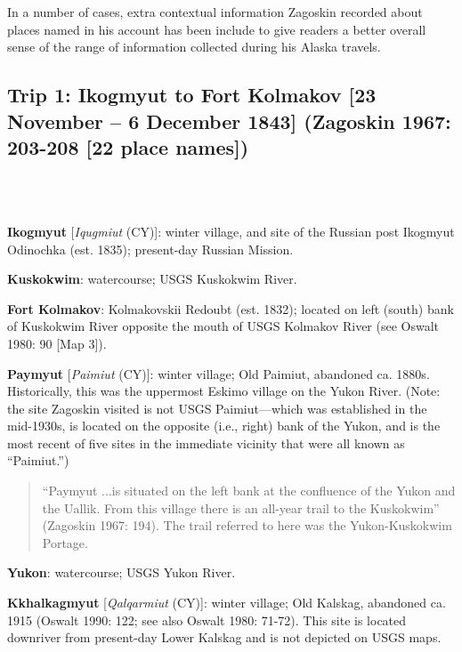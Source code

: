 In a number of cases, extra contextual information Zagoskin recorded about places named in his account has been include to give readers a better overall sense of the range of information collected during his Alaska travels.



\subsection*{Trip 1: Ikogmyut to Fort Kolmakov [23 November – 6 December 1843]
(Zagoskin 1967: 203-208 [22 place names])}
\ \\
\ \\

\begin{hang}

\textbf{Ikogmyut} [\textit{Iqugmiut} (CY)]: winter village, and site of the Russian post Ikogmyut Odinochka (est. 1835); present-day Russian Mission.



\textbf{Kuskokwim}: watercourse; USGS Kuskokwim River.



\textbf{Fort Kolmakov}: Kolmakovskii Redoubt (est. 1832); located on left (south) bank of Kuskokwim River opposite the mouth of USGS Kolmakov River (see Oswalt 1980: 90 [Map 3]).



\textbf{Paymyut} [\textit{Paimiut} (CY)]: winter village; Old Paimiut, abandoned ca. 1880s. Historically, this was the uppermost Eskimo village on the Yukon River. (Note: the site Zagoskin visited is not USGS Paimiut—which was established in the mid-1930s, is located on the opposite (i.e., right) bank of the Yukon, and is the most recent of five sites in the immediate vicinity that were all known as “Paimiut.”)



\begin{quote}“Paymyut ...is situated on the left bank at the confluence of the Yukon and the Uallik. From this village there is an all-year trail to the Kuskokwim” (Zagoskin 1967: 194). The trail referred to here was the Yukon-Kuskokwim Portage.
\end{quote}



\textbf{Yukon}: watercourse; USGS Yukon River.



\textbf{Kkhalkagmyut} [\textit{Qalqarmiut} (CY)]: winter village; Old Kalskag, abandoned ca. 1915 (Oswalt 1990: 122; see also Oswalt 1980: 71-72). This site is located downriver from present-day Lower Kalskag and is not depicted on USGS maps.




\end{hang}
